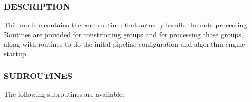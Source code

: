 \subsubsection*{DESCRIPTION\label{ORAC::Core_DESCRIPTION}}


This module contains the core routines that actually handle the
data processing. Routines are provided for constructing groups
and for processing those groups, along with routines to do the
inital pipeline configuration and algorithm engine startup.

\subsubsection*{SUBROUTINES\label{ORAC::Core_SUBROUTINES}}


The following subroutines are available:

